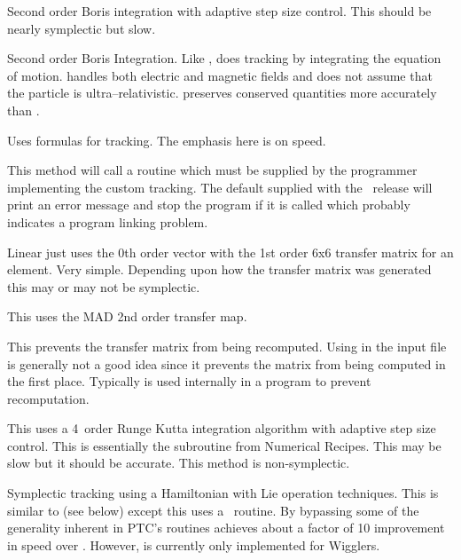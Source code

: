 \begin{description}
\item[\vn{Adaptive_Boris}]
Second order Boris integration\cite{b:boris} with adaptive step size control.
This should be nearly symplectic but slow.

\item[\vn{Boris}]
Second order Boris Integration\cite{b:boris}. Like ,
 does tracking by integrating the equation of
motion.  handles both electric and magnetic fields and does
not assume that the particle is ultra--relativistic.  preserves
conserved quantities more accurately than .

\item[\vn{Bmad_Standard}]
Uses formulas for tracking. The emphasis here is on speed.

\item[\vn{Custom}]
This method will call a routine  which must be
supplied by the programmer implementing the custom tracking. The
default  supplied with the \bmad\ release will print
an error message and stop the program if it is called which probably
indicates a program linking problem.

\item[\vn{Linear}]
Linear just uses the 0th order vector with the 1st order 6x6 transfer
matrix for an element. Very simple.  Depending upon how the transfer
matrix was generated this may or may not be symplectic.

\item[\vn{MAD}]
This uses the MAD 2nd order transfer map.

\item[\vn{None}]
This prevents the transfer matrix from being recomputed.
Using  in the input file is generally not a good idea since
it prevents the matrix from being computed in the first place.
Typically  is used internally in a program to prevent recomputation.

\item[\vn{Runge_Kutta}]
This uses a 4\Th\ order Runge Kutta integration algorithm with adaptive
step size control.  This is essentially the  subroutine
from Numerical Recipes\cite{b:nr}. This may be slow but it should be
accurate. This method is non-symplectic.

\item[\vn{Symp_Lie_Bmad}]
Symplectic tracking using a Hamiltonian with Lie operation techniques.
This is similar to  (see below) except this uses a
\bmad\ routine. By bypassing some of the generality inherent in PTC's routines
 achieves about a factor of 10 improvement in speed over
. However,  is
currently only implemented for Wigglers.


\end{description}
